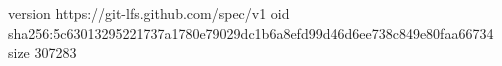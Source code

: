 version https://git-lfs.github.com/spec/v1
oid sha256:5c63013295221737a1780e79029dc1b6a8efd99d46d6ee738c849e80faa66734
size 307283
